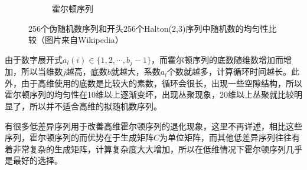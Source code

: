 \begin{figure}
{\begin{subfigure}[b]{0.32\textwidth}
		\caption{霍尔顿序列}
	\end{subfigure}}
	\caption{256个伪随机数序列和开头256个Halton(2,3)序列中随机数的均匀性比较（图片来自Wikipedia） }
	\label{f:mc-halton}
\end{figure}

由于数字展开式$a_l(i)\in \{1,2,\cdots,b_j-1 \}$，而霍尔顿序列的底数随维数增加而增加，所以当维数$j$越高，底数$b$就越大，系数$a_l$个数就越多，计算循环时间越长。此外，由于高维使用的底数是比较大的素数，循环会很长，出现一些空隙结构，所以霍尔顿序列的均匀性在10维以上逐渐变坏，出现丛聚现象，20维以上丛聚就比较明显了，所以并不适合高维的拟随机数序列。

有很多低差异序列用于改善高维霍尔顿序列的退化现象，这里不再详述，相比这些序列，霍尔顿序列的而优势在于生成矩阵$C$为单位矩阵，而其他低差异序列往往有着非常复杂的生成矩阵，计算复杂度大大增加，所以在低维情况下霍尔顿序列几乎是最好的选择。
